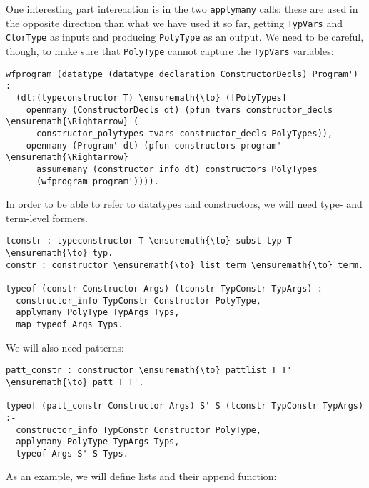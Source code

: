 One interesting part intereaction is in the two \texttt{applymany}
calls: these are used in the opposite direction than what we have used
it so far, getting \texttt{TypVars} and \texttt{CtorType} as inputs and
producing \texttt{PolyType} as an output. We need to be careful, though,
to make sure that \texttt{PolyType} cannot capture the \texttt{TypVars}
variables:

\begin{verbatim}
wfprogram (datatype (datatype_declaration ConstructorDecls) Program') :-
  (dt:(typeconstructor T) \ensuremath{\to} ([PolyTypes]
    openmany (ConstructorDecls dt) (pfun tvars constructor_decls \ensuremath{\Rightarrow} (
      constructor_polytypes tvars constructor_decls PolyTypes)),
    openmany (Program' dt) (pfun constructors program' \ensuremath{\Rightarrow}
      assumemany (constructor_info dt) constructors PolyTypes
      (wfprogram program')))).
\end{verbatim}

In order to be able to refer to datatypes and constructors, we will need
type- and term-level formers.

\begin{verbatim}
tconstr : typeconstructor T \ensuremath{\to} subst typ T \ensuremath{\to} typ.
constr : constructor \ensuremath{\to} list term \ensuremath{\to} term.

typeof (constr Constructor Args) (tconstr TypConstr TypArgs) :-
  constructor_info TypConstr Constructor PolyType,
  applymany PolyType TypArgs Typs,
  map typeof Args Typs.
\end{verbatim}

We will also need patterns:

\begin{verbatim}
patt_constr : constructor \ensuremath{\to} pattlist T T' \ensuremath{\to} patt T T'.

typeof (patt_constr Constructor Args) S' S (tconstr TypConstr TypArgs) :-
  constructor_info TypConstr Constructor PolyType,
  applymany PolyType TypArgs Typs,
  typeof Args S' S Typs.
\end{verbatim}

As an example, we will define lists and their append function:

